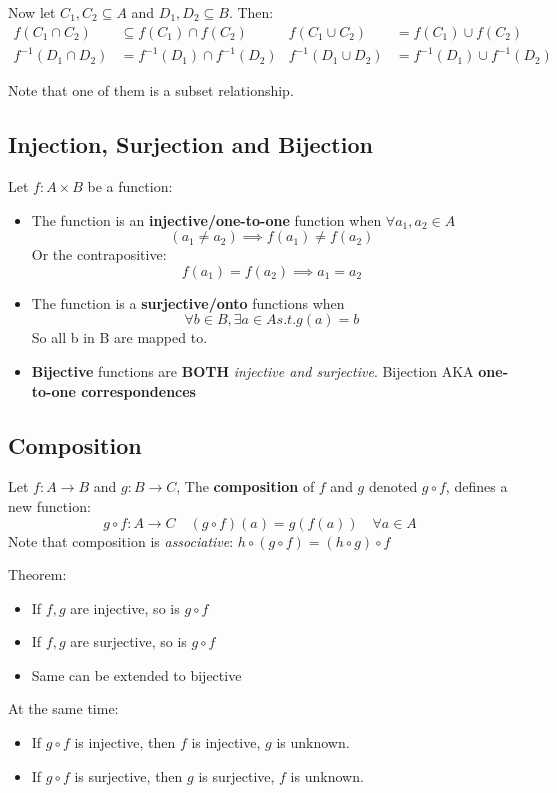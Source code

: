 \documentclass[letterpaper,12pt]{article}
\begin{document}
Now let $C_1, C_2\subseteq A$ and $D_1,D_2\subseteq B$. Then:
\begin{align*}
    f(C_1\cap C_2)&\subseteq f(C_1)\cap f(C_2) & f(C_1\cup C_2)&=f(C_1)\cup f(C_2)\\
    f^{-1}(D_1\cap D_2)& =f^{-1}(D_1)\cap f^{-1}(D_2) & f^{-1}(D_1\cup D_2)& =f^{-1}(D_1)\cup f^{-1}(D_2)
\end{align*}

Note that one of them is a subset relationship. 

\subsection{Injection, Surjection and Bijection}
Let $f:A\times B$ be a function:
\begin{itemize}
    \item The function is an \textbf{injective/one-to-one} function when $\forall a_1,a_2 \in A$
    \[(a_1\neq a_2)\implies f(a_1)\neq f(a_2) \]
    Or the contrapositive:
    \[f(a_1)=f(a_2)\implies a_1=a_2\]

    \item The function is a \textbf{surjective/onto} functions when \[\forall b\in B, \exists a\in A s.t.g(a)=b\] So all b in B are mapped to. 
    \item \textbf{Bijective} functions are \textbf{BOTH} \textit{injective and surjective}. Bijection AKA \textbf{one-to-one correspondences}
\end{itemize}

\subsection{Composition}
Let $f:A\to B$ and $g:B\to C$, The \textbf{composition} of $f$ and $g$ denoted $g \circ f$, defines a new function: 
\[g \circ f : A\to C \quad (g\circ f)(a)=g(f(a))\quad \forall a\in A\]
Note that composition is \textit{associative}: $h\circ(g\circ f)=(h\circ g)\circ f$

Theorem:
\begin{itemize}
    \item If $f,g$ are injective, so is $g\circ f$
    \item If $f,g$ are surjective, so is $g\circ f$
    \item Same can be extended to bijective
\end{itemize}

At the same time:
\begin{itemize}
    \item If $g\circ f$ is injective, then $f$ is injective, $g$ is unknown.
    \item If $g\circ f$ is surjective, then $g$ is surjective, $f$ is unknown.
\end{itemize}
\end{document}
